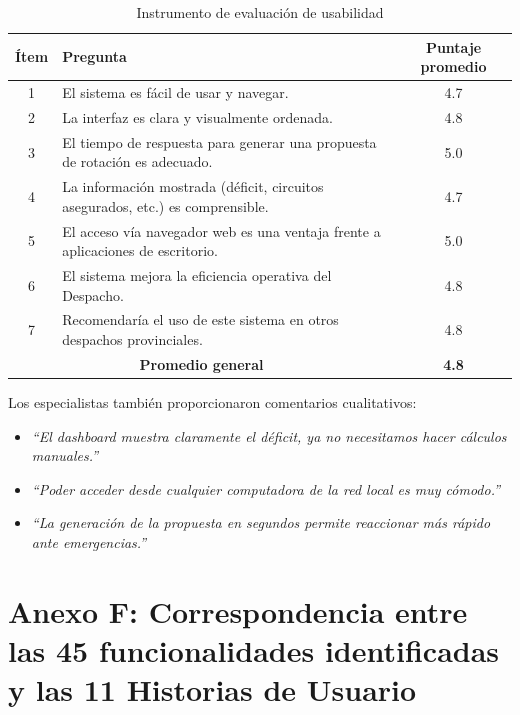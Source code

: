 \begin{table}[H]
\centering
\caption{Instrumento de evaluación de usabilidad}
\label{tab:cuestionario_usabilidad}
\footnotesize
\begin{tabular}{|c|p{10cm}|c|}
\hline
\textbf{Ítem} & \textbf{Pregunta} & \textbf{Puntaje promedio} \\
\hline
1 & El sistema es fácil de usar y navegar. & 4.7 \\
\hline
2 & La interfaz es clara y visualmente ordenada. & 4.8 \\
\hline
3 & El tiempo de respuesta para generar una propuesta de rotación es adecuado. & 5.0 \\
\hline
4 & La información mostrada (déficit, circuitos asegurados, etc.) es comprensible. & 4.7 \\
\hline
5 & El acceso vía navegador web es una ventaja frente a aplicaciones de escritorio. & 5.0 \\
\hline
6 & El sistema mejora la eficiencia operativa del Despacho. & 4.8 \\
\hline
7 & Recomendaría el uso de este sistema en otros despachos provinciales. & 4.8 \\
\hline
\multicolumn{2}{|c|}{\textbf{Promedio general}} & \textbf{4.8} \\
\hline
\end{tabular}
\end{table}

Los especialistas también proporcionaron comentarios cualitativos:
\begin{itemize}
    \item \textit{“El dashboard muestra claramente el déficit, ya no necesitamos hacer cálculos manuales.”}
    \item \textit{“Poder acceder desde cualquier computadora de la red local es muy cómodo.”}
    \item \textit{“La generación de la propuesta en segundos permite reaccionar más rápido ante emergencias.”}
\end{itemize}

\section*{Anexo F: Correspondencia entre las 45 funcionalidades identificadas y las 11 Historias de Usuario}

